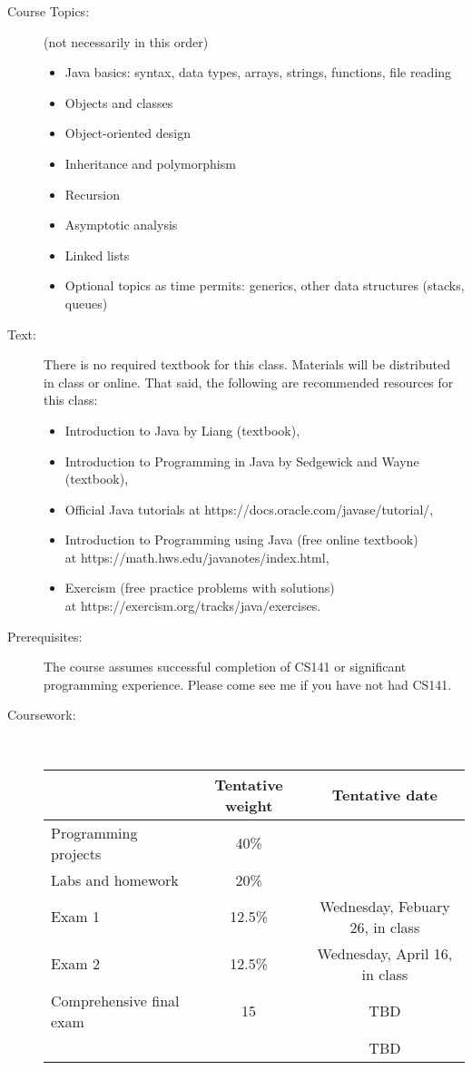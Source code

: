 \documentclass [letterpaper,11pt]{article}
\begin{document}
\begin{description}
\item[Course Topics:] (not necessarily in this order) 
\begin{itemize} \setlength{\itemsep}{0em}\setlength{\parskip}{0pt}
	\item Java basics: syntax, data types, arrays, strings, functions, file reading
	\item Objects and classes
	\item Object-oriented design
	\item Inheritance and polymorphism
	\item Recursion
	\item Asymptotic analysis
	\item Linked lists
	\item Optional topics as time permits: generics, other data structures (stacks, queues)
	\end{itemize}



\item[Text:]
   There is no required textbook for this class.  Materials will be distributed in class
   or online.  That said, the following are recommended resources for this class:

\begin{itemize} \setlength{\itemsep}{0em}\setlength{\parskip}{0pt}
	\item Introduction to Java by Liang (textbook),
	\item Introduction to Programming in Java by Sedgewick and Wayne (textbook),
	\item Official Java tutorials at https://docs.oracle.com/javase/tutorial/,
	\item Introduction to Programming using Java (free online textbook)\\
at https://math.hws.edu/javanotes/index.html,
	\item Exercism (free practice problems with solutions)\\at https://exercism.org/tracks/java/exercises.
	\end{itemize}

\item[Prerequisites:]
The course assumes successful completion of CS141 or significant programming experience.  Please come see me if you have not had CS141.

\item[Coursework:] \

\begin{tabular}{lcc} 
& Tentative weight & Tentative date \\ \hline
Programming projects & 40\% & \\
Labs and homework & 20\% & \\
Exam 1 & 12.5\% & Wednesday, Febuary 26, in class \\
Exam 2 & 12.5\% & Wednesday, April 16, in class\\
Comprehensive final exam & 15 & TBD \\
&& TBD%
\end{tabular}


\end{description}
\end{document}
